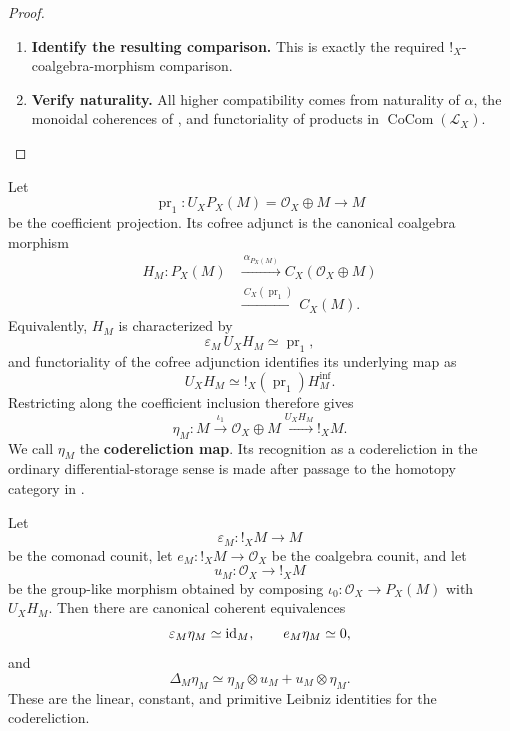 \begin{proof}
\begin{enumerate}[label=\textup{(\arabic*)}]
    \item \textbf{Identify the resulting comparison.}
    This is exactly the required \(!_X\)-coalgebra-morphism comparison.

    \item \textbf{Verify naturality.}
    All higher compatibility comes from naturality of \(\alpha\), the monoidal coherences of
    , and functoriality of products in \(\operatorname{CoCom}(\mathcal L_X)\).
\end{enumerate}
\end{proof}

\begin{construction}[Codereliction]
\label{con:tangent-codereliction}
Let
\[
    \operatorname{pr}_1:U_XP_X(M)=\mathcal O_X\oplus M\longrightarrow M
\]
be the coefficient projection. Its cofree adjunct is the canonical coalgebra
morphism
\[
\begin{aligned}
    H_M:
    P_X(M)
    &\xrightarrow{\ \alpha_{P_X(M)}\ }
    C_X(\mathcal O_X\oplus M)
    \\
    &\xrightarrow{\ C_X(\operatorname{pr}_1)\ }
    C_X(M).
\end{aligned}
\]
Equivalently, \(H_M\) is characterized by
\[
    \varepsilon_M\,U_XH_M\simeq\operatorname{pr}_1,
\]
and functoriality of the cofree adjunction identifies its underlying map as
\[
    U_XH_M
    \simeq
    !_X(\operatorname{pr}_1)H^{\inf}_M.
\]
Restricting along the coefficient inclusion therefore gives
\[
    \eta_M:
    M
    \xrightarrow{\iota_1}
    \mathcal O_X\oplus M
    \xrightarrow{U_XH_M}
    !_XM.
\]
We call \(\eta_M\) the \textbf{codereliction map}. Its recognition as a
codereliction in the ordinary differential-storage sense is made after
passage to the homotopy category in
.
\end{construction}

\begin{proposition}
\label{prop:basic-codereliction-identities}
Let
\[
    \varepsilon_M:!_XM\longrightarrow M
\]
be the comonad counit, let
\(e_M:!_XM\to\mathcal O_X\) be the coalgebra counit, and let
\[
    u_M:\mathcal O_X\longrightarrow !_XM
\]
be the group-like morphism obtained by composing
\(\iota_0:\mathcal O_X\to P_X(M)\) with \(U_XH_M\). Then there are canonical
coherent equivalences
\[
    \varepsilon_M\eta_M\simeq\operatorname{id}_M,
    \qquad
    e_M\eta_M\simeq0,
\]
and
\[
    \Delta_M\eta_M
    \simeq
    \eta_M\otimes u_M+u_M\otimes\eta_M.
\]
These are the linear, constant, and primitive Leibniz identities for the
codereliction.
\end{proposition}

